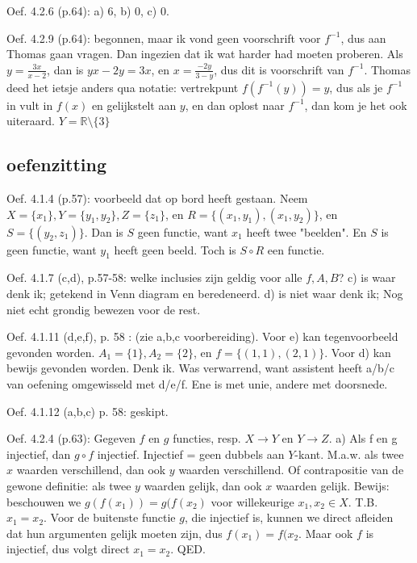 \documentclass{article}
\begin{document}
Oef. 4.2.6 (p.64): a) 6, b) 0, c) 0. 


Oef. 4.2.9 (p.64): begonnen, maar ik vond geen voorschrift voor $f^{-1}$, dus aan Thomas gaan vragen. Dan ingezien dat ik wat harder had moeten proberen. 
Als $y = \frac{3x}{x-2}$, dan is $yx-2y=3x$, en $x= \frac{-2y}{3-y}$, dus dit is voorschrift van $f^{-1}$. Thomas deed het ietsje anders qua notatie: vertrekpunt $f(f^{-1}(y)) = y$, dus als je $f^{-1}$ in vult in $f(x)$ en gelijkstelt aan $y$, en dan oplost naar $f^{-1}$, dan kom je het ook uiteraard. 
$Y = \mathbb{R} \setminus \{ 3 \}$


\subsection*{oefenzitting} 

Oef. 4.1.4 (p.57):  
voorbeeld dat op bord heeft gestaan. Neem $X=\{x_1\}, Y=\{y_1, y_2\}, Z= \{z_1  \} $, en $R=\{(x_1, y_1), (x_1, y_2) \}$, en $S =\{(y_2, z_1) \}  $. Dan is $S$ geen functie, want $x_1$ heeft twee "beelden". En $S$ is geen functie, want $y_1$ heeft geen beeld. Toch is $S \circ R$ een functie. 


Oef. 4.1.7 (c,d), p.57-58: welke inclusies zijn geldig voor alle $f, A, B$?  c) is waar denk ik; getekend in Venn diagram en beredeneerd. d) is niet waar denk ik; Nog niet echt grondig bewezen voor de rest. 



Oef. 4.1.11 (d,e,f), p. 58 : (zie a,b,c voorbereiding). Voor e) kan tegenvoorbeeld gevonden worden. $A_1=\{ 1 \}, A_2=\{ 2 \} $, en $f = \{ (1,1), (2,1) \}  $. 
Voor d) kan bewijs gevonden worden. Denk ik. Was verwarrend, want assistent heeft a/b/c van oefening omgewisseld met d/e/f. Ene is met unie, andere met doorsnede. 


Oef. 4.1.12 (a,b,c) p. 58: geskipt. 

Oef. 4.2.4 (p.63):  
Gegeven $f$ en $g$ functies, resp. $X \rightarrow Y$ en $Y \rightarrow Z$. 
a) Als f en g injectief, dan $g \circ f$ injectief. 
Injectief = geen dubbels aan $Y$-kant. M.a.w. als twee $x$ waarden verschillend, dan ook $y$ waarden verschillend. Of contrapositie van de gewone definitie: als twee $y$ waarden gelijk, dan ook $x$ waarden gelijk. 
Bewijs: beschouwen we $g(f(x_1))  = g(f(x_2)$ voor willekeurige $x_1, x_2 \in X$. T.B. $x_1=x_2$. 
Voor de buitenste functie $g$, die injectief is, kunnen we direct afleiden dat hun argumenten gelijk moeten zijn, dus $f(x_1)  = f(x_2$. Maar ook $f$ is injectief, dus volgt direct $x_1=x_2$. QED.
\end{document}
